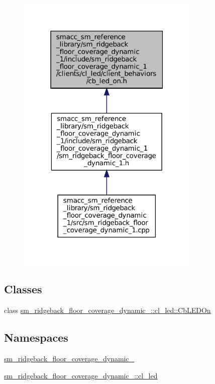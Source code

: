 \begin{figure}[H]
\begin{center}
\leavevmode
\includegraphics[width=247pt]{sm__ridgeback__floor__coverage__dynamic__1_2include_2sm__ridgeback__floor__coverage__dynamic__1_d151dcdc790a356fc410241f13cd7db7}
\end{center}
\end{figure}
\subsection*{Classes}
\begin{DoxyCompactItemize}
\item 
class \hyperlink{classsm__ridgeback__floor__coverage__dynamic__1_1_1cl__led_1_1CbLEDOn}{sm\+\_\+ridgeback\+\_\+floor\+\_\+coverage\+\_\+dynamic\+\_\+::cl\+\_\+led\+::\+Cb\+L\+E\+D\+On}
\end{DoxyCompactItemize}
\subsection*{Namespaces}
\begin{DoxyCompactItemize}
\item 
 \hyperlink{namespacesm__ridgeback__floor__coverage__dynamic__1}{sm\+\_\+ridgeback\+\_\+floor\+\_\+coverage\+\_\+dynamic\+\_}
\item 
 \hyperlink{namespacesm__ridgeback__floor__coverage__dynamic__1_1_1cl__led}{sm\+\_\+ridgeback\+\_\+floor\+\_\+coverage\+\_\+dynamic\+\_\+::cl\+\_\+led}
\end{DoxyCompactItemize}
